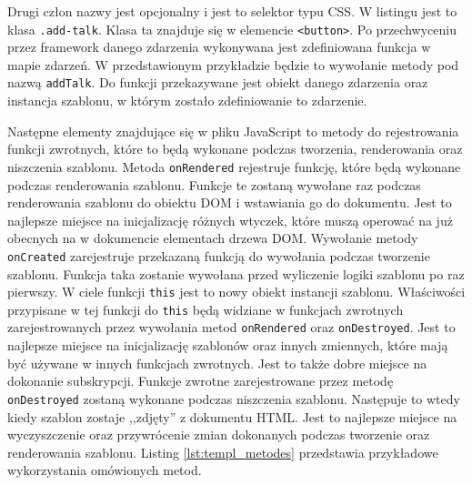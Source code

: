 Drugi człon nazwy jest opcjonalny i jest to selektor typu CSS. W listingu jest to klasa \verb|.add-talk|. Klasa ta znajduje się w elemencie \verb|<button>|. Po przechwyceniu przez framework danego zdarzenia wykonywana jest zdefiniowana funkcja w mapie zdarzeń. W przedstawionym przykładzie będzie to wywołanie metody pod nazwą \verb|addTalk|. Do funkcji przekazywane jest obiekt danego zdarzenia oraz instancja szablonu, w którym zostało zdefiniowanie to zdarzenie. 

Następne elementy znajdujące się w pliku JavaScript to metody do rejestrowania funkcji zwrotnych, które to będą wykonane podczas tworzenia, renderowania oraz niszczenia szablonu. Metoda \verb|onRendered| rejestruje funkcję, które będą wykonane podczas renderowania szablonu. Funkcje te zostaną wywołane raz podczas renderowania szablonu do obiektu DOM i wstawiania go do dokumentu. Jest to najlepsze miejsce na inicjalizację różnych wtyczek, które muszą operować na już obecnych na w dokumencie elementach drzewa DOM. \newline
Wywołanie metody \verb|onCreated| zarejestruje przekazaną funkcją do wywołania podczas tworzenie szablonu. Funkcja taka zostanie wywołana przed wyliczenie logiki szablonu po raz pierwszy. W ciele funkcji \verb|this| jest to nowy obiekt instancji szablonu. Właściwości przypisane w tej funkcji do \verb|this| będą widziane w funkcjach zwrotnych zarejestrowanych przez wywołania metod \verb|onRendered| oraz \verb|onDestroyed|. Jest to najlepsze miejsce na inicjalizację szablonów oraz innych zmiennych, które mają być używane w innych funkcjach zwrotnych. Jest to także dobre miejsce na dokonanie subskrypcji. \newline
Funkcje zwrotne zarejestrowane przez metodę \verb|onDestroyed| zostaną wykonane podczas niszczenia szablonu. Następuje to wtedy kiedy szablon zostaje ,,zdjęty'' z dokumentu HTML. Jest to najlepsze miejsce na wyczyszczenie oraz przywrócenie zmian dokonanych podczas tworzenie oraz renderowania szablonu. Listing \ref{lst:templ_metodes} przedstawia przykładowe wykorzystania omówionych metod.
